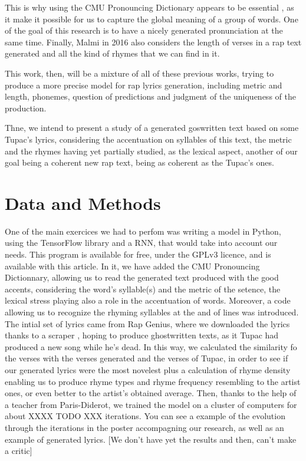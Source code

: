 \documentclass[12pt,a4paper]{article}
\begin{document}
This is why using the CMU Pronouncing Dictionary appears to be essential \cite{hirjee_using_2010}, as it make it possible for us to capture the global meaning of a group of words. One of the goal of this research is to have a nicely generated pronunciation at the same time. Finally, Malmi in 2016 also considers the length of verses in a rap text generated and all the kind of rhymes that we can find in it. \newline

This work, then, will be a mixture of all of these previous works, trying to produce a more precise model for rap lyrics generation, including metric and length, phonemes, question of predictions and judgment of the uniqueness of the production. 

Thne, we intend to present a study of a generated goswritten text based on some Tupac's lyrics, considering the accentuation on syllables of this text, the metric and the rhymes having yet partially studied, as the lexical aspect, another of our goal being a coherent new rap text, being as coherent as the Tupac's ones. \newline

\section{Data and Methods}

One of the main exercices we had to perfom was writing a model in Python, using the TensorFlow library and a RNN, that would take into account our needs.  This program is available for free, under the GPLv3 licence, and is available with this article. In it, we have added the CMU Pronouncing Dictionnary, allowing us to read the generated text produced with the good accents, considering the word's syllable(s) and the metric of the setence, the lexical stress playing also a role in the accentuation of words. Moreover, a code allowing us to recognize the rhyming syllables at the and of lines was introduced. The intial set of lyrics came from Rap Genius, where we downloaded the lyrics thanks to a scraper \cite{paupier_raplyrics-scraper_2018}, hoping to produce ghostwritten texts, as it Tupac had produced a new song while he's dead. In this way, we calculated the similarity fo the verses with the verses generated and the verses of Tupac, in order to see if our generated lyrics were the most novelest plus a calculation of rhyme density enabling us to produce rhyme types and rhyme frequency resembling to the artist ones, or even better to the artist’s obtained average. Then, thanks to the help of a teacher from Paris-Diderot, we trained the model on a cluster of computers for about XXXX TODO XXX iterations. You can see a example of the evolution through the iterations in the poster accompagning our research, as well as an example of generated lyrics. [We don't have yet the results and then, can't make a critic]



\end{document}
